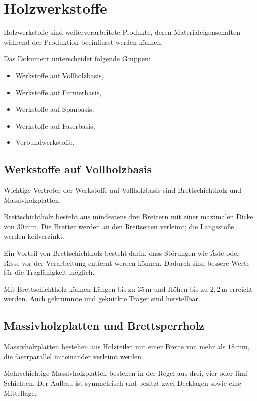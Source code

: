 \documentclass[
  12pt,
  a4paper,
  oneside
]{scrreprt}
\begin{document}
\section{Holzwerkstoffe}

Holzwerkstoffe sind weiterverarbeitete Produkte, deren
Materialeigenschaften während der Produktion beeinflusst werden können.


Das Dokument unterscheidet folgende Gruppen:

\begin{itemize}
  \item Werkstoffe auf Vollholzbasis,
  \item Werkstoffe auf Furnierbasis,
  \item Werkstoffe auf Spanbasis,
  \item Werkstoffe auf Faserbasis,
  \item Verbundwerkstoffe.
\end{itemize}



\subsection{Werkstoffe auf Vollholzbasis}

Wichtige Vertreter der Werkstoffe auf Vollholzbasis sind
Brettschichtholz und Massivholzplatten. 

Brettschichtholz besteht aus mindestens drei Brettern mit einer
maximalen Dicke von $30\,\mathrm{mm}$. Die Bretter werden an den
Breitseiten verleimt; die Längsstöße werden keilverzinkt.


Ein Vorteil von Brettschichtholz besteht darin, dass Störungen wie Äste
oder Risse vor der Verarbeitung entfernt werden können. Dadurch sind
bessere Werte für die Tragfähigkeit möglich. 

Mit Brettschichtholz können Längen bis zu $35\,\mathrm{m}$ und Höhen
bis zu $2{,}2\,\mathrm{m}$ erreicht werden. Auch gekrümmte und
geknickte Träger sind herstellbar. 

\subsection{Massivholzplatten und Brettsperrholz}

Massivholzplatten bestehen aus Holzteilen mit einer Breite von mehr als
$18\,\mathrm{mm}$, die faserparallel miteinander verleimt werden.


Mehrschichtige Massivholzplatten bestehen in der Regel aus drei, vier
oder fünf Schichten. Der Aufbau ist symmetrisch und besitzt zwei
Decklagen sowie eine Mittellage. 
\end{document}
